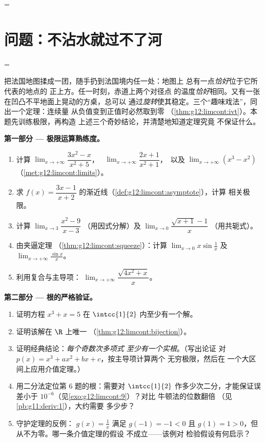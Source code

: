 =\section{问题：不沾水就过不了河}

=\begin{problem}
\label{pb:g12:limcont:1}
  把法国地图揉成一团，随手扔到法国境内任一处：地图上
  总有一点\emph{恰好}位于它所代表的地点的
  正上方。任一时刻，赤道上两个对径点
  的温度\emph{恰好}相同。又有一张
  在凹凸不平地面上晃动的方桌，总可以
  通过\emph{旋转}使其稳定。三个“趣味戏法”，同出一个定理：连续量
  从负值变到正值时必然取到零
  （\cref{thm:g12:limcont:ivt}）。本题先训练极限，再构造
  上述三个奇妙结论，并清楚地知道定理究竟
  不保证什么。

\medskip
\noindent\textbf{第一部分 --- 极限运算熟练度。}
\begin{enumerate}
  \item 计算 $\lim_{x \to +\infty} \dfrac{3x^2 - x}{x^2 + 5}$，
        \ $\lim_{x \to +\infty} \dfrac{2x + 1}{x^2 + 1}$，\ 以及
        $\lim_{x \to +\infty} (x^3 - x^2)$
        （\cref{met:g12:limcont:limits}）。
  \item 求
        $f(x) = \dfrac{3x - 1}{x + 2}$
        的渐近线（\cref{def:g12:limcont:asymptote}），计算
        相关极限。
  \item 计算 $\lim_{x \to 3} \dfrac{x^2 - 9}{x - 3}$
        （用因式分解）及
        $\lim_{x \to 0} \dfrac{\sqrt{x + 1} - 1}{x}$
        （用共轭式）。
  \item 由夹逼定理
        （\cref{thm:g12:limcont:squeeze}）：计算
        $\lim_{x \to 0} x \sin\frac1x$ 及
        $\lim_{x \to +\infty} \frac{\sin x}{x}$。
  \item 利用复合与主导项：
        $\lim_{x \to +\infty} \dfrac{\sqrt{4x^2 + x}}{x}$。
\end{enumerate}

\medskip
\noindent\textbf{第二部分 --- 根的严格验证。}
\begin{enumerate}[resume]
  \item 证明方程 $x^3 + x = 5$ 在
        $\intcc{1}{2}$ 内至少有一个解。
  \item 证明该解在 $\R$ 上唯一
        （\cref{thm:g12:limcont:bijection}）。
  \item 证明经典结论：\emph{每个奇数次多项式
        至少有一个实根}。（写出论证
        对 $p(x) = x^3 + a x^2 + b x + c$，按主导项计算两个
        无穷极限，然后在
        一个大区间上应用介值定理。）
  \item 用二分法定位第 6 题的根：需要对
        $\intcc{1}{2}$ 作多少次二分，才能保证误差小于
        $10^{-6}$（见\cref{exo:g12:limcont:9}）？对比
        牛顿法的位数翻倍
        （见\cref{pb:g11:deriv:1}），大约需要
        多少步？
  \item 守护定理的反例：
        $g(x) = \frac1x$ 满足 $g(-1) = -1 < 0$ 且
        $g(1) = 1 > 0$，但从不为零。哪一条介值定理的假设
        不成立——该例对
        检验假设有何启示？
\end{enumerate}


\end{problem}
